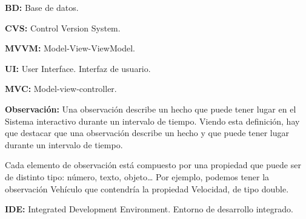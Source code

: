 \textbf{BD:} Base de datos.

\textbf{CVS:} Control Version System.

\textbf{MVVM:} Model-View-ViewModel.

\textbf{UI:} User Interface. Interfaz de usuario.

\textbf{MVC:} Model-view-controller.

\textbf{Observaci\'{o}n:} Una observación describe un hecho que puede tener lugar en el Sistema interactivo 
durante un intervalo de tiempo. Viendo esta definición, hay que destacar que una
observación describe un hecho y que puede tener lugar durante un intervalo de
tiempo.

Cada elemento de observación está compuesto por una propiedad que puede ser de
distinto tipo: número, texto, objeto… Por ejemplo, podemos tener la observación
Vehículo que contendría la propiedad Velocidad, de tipo double. \cite{INTRASIM:manual}

\textbf{IDE:} Integrated Development Environment. Entorno de desarrollo integrado.
 
